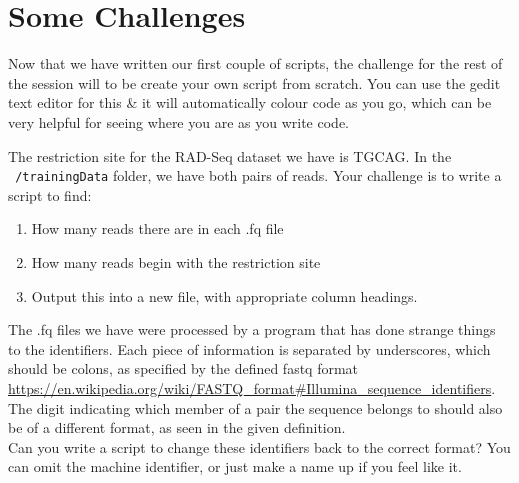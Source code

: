 \documentclass[a4paper,12pt,twoside]{memoir}
\begin{document}
\section{Some Challenges}
Now that we have written our first couple of scripts, the challenge for the rest of the session will to be create your own script from scratch.
You can use the gedit text editor for this \& it will automatically colour code as you go, which can be very helpful for seeing where you are as you write code.

\begin{steps}
The restriction site for the RAD-Seq dataset we have is TGCAG.
In the \texttt{~/trainingData} folder, we have both pairs of reads.
Your challenge is to write a script to find:
\begin{enumerate}
\item How many reads there are in each .fq file
\item How many reads begin with the restriction site
\item Output this into a new file, with appropriate column headings. \\
\end{enumerate}
\end{steps}

\begin{steps}
The .fq files we have were processed by a program that has done strange things to the identifiers.
Each piece of information is separated by underscores, which should be colons, as specified by the defined fastq format \url{https://en.wikipedia.org/wiki/FASTQ_format#Illumina_sequence_identifiers}.
The digit indicating which member of a pair the sequence belongs to should also be of a different format, as seen in the given definition.\\

Can you write a script to change these identifiers back to the correct format? 
You can omit the machine identifier, or just make a name up if you feel like it.
\end{steps}
\end{document}
